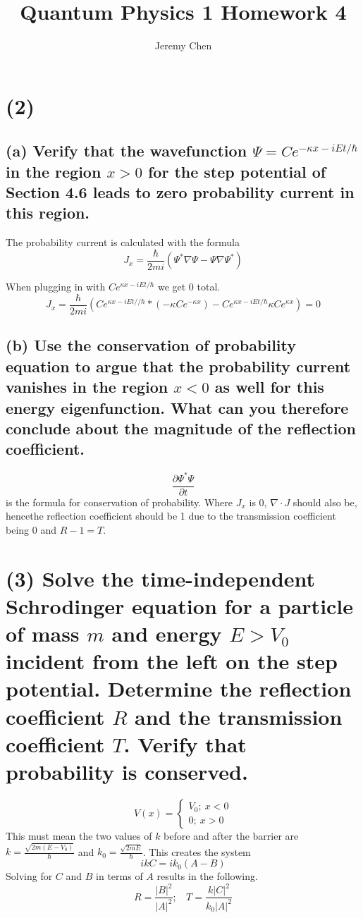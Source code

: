 \documentclass[10pt,letterpaper]{article}
\title{Quantum Physics 1 Homework 4}
\author{Jeremy Chen}
\begin{document}
	\maketitle
	
\section*{(2)}
\subsection*{(a) Verify that the wavefunction $\Psi = Ce^{-\kappa x - iEt/\hbar}$ in the region $x > 0$ for the step potential of Section 4.6 leads to zero probability current in this region.}
The probability current is calculated with the formula 
$$J_x = \frac{\hbar}{2mi} (\Psi^{*} \nabla \Psi - \Psi \nabla \Psi^{*})$$

When plugging in with $Ce^{\kappa x - iEt/\hbar}$ we get 0 total. 
$$J_{x} = \frac{\hbar}{2mi}(Ce^{\kappa x - iEt//\hbar} * (- \kappa Ce^{-\kappa x}) - Ce^{\kappa x - iEt/\hbar} \kappa Ce^{\kappa x}) = 0$$
\subsection*{(b) Use the conservation of probability equation to argue that the probability current vanishes in the region $x < 0$ as well for this energy eigenfunction. What can you therefore conclude about the magnitude of the reflection coefficient.}
$$\frac{\partial \Psi^{*}\Psi}{\partial t}$$
is the formula for conservation of probability. Where $J_{x}$ is 0, $\nabla \cdot J$ should also be, hencethe reflection coefficient should be 1 due to the transmission coefficient being 0 and $R - 1 = T$. 

\section*{(3) Solve the time-independent Schrodinger equation for a particle of mass $m$ and energy $E > V_{0}$ incident from the left on the step potential. Determine the reflection coefficient $R$ and the transmission coefficient $T$. Verify that probability is conserved.}
$$V(x) = \begin{cases}
V_{0};\ x < 0 \\
0;\ x > 0
\end{cases}$$
This must mean the two values of $k$ before and after the barrier are $k = \frac{\sqrt{2m(E - V_{0})}}{\hbar}$ and $k_{0} = \frac{\sqrt{2mE}}{\hbar}$. This creates the system
$$ikC = ik_{0}(A - B)$$
Solving for $C$ and $B$ in terms of $A$ results in the following.
$$R = \frac{|B|^{2}}{|A|^{2}};\ \ \ \ T = \frac{k|C|^{2}}{k_{0}|A|^{2}}$$
\end{document}
